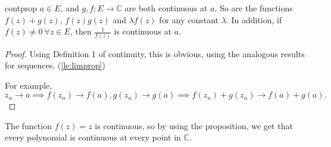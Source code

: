 \begin{proposition}{}{contprop}
    \(a \in E\), and \(g, f: E \to \mathbb{C}\) are both continuous at \(a\). So are the functions \(f(z) + g(z)\), \(f(z)g(z)\) and \(\lambda f(z)\) for any constant \(\lambda\). In addition, if \(f(z)\neq 0~\forall z \in E\), then \(\frac{1}{f(z)}\) is continuous at \(a\).
\end{proposition}
\begin{proof}
    Using Definition 1 of continuity, this is obvious, using the analogous results for sequences. (\cref{le:limprop})

    For example,
    \[z_n \to a \implies f(z_n) \to f(a), g(z_n) \to g(a) \implies f(z_n) + g(z_n) \to f(a) + g(a).\]
\end{proof}
The function \(f(z) = z\) is continuous, so by using the proposition, we get that every polynomial is continuous at every point in \(\mathbb{C}\).

